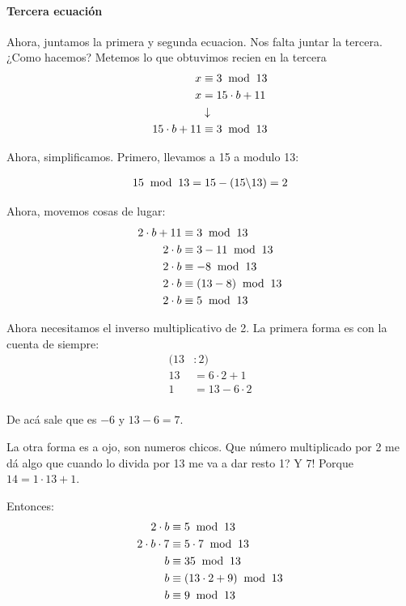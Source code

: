 \documentclass[12pt,a4paper]{report}
\begin{document}
\paragraph{Tercera ecuación}
Ahora, juntamos la primera y segunda ecuacion. Nos falta juntar la tercera. ¿Como hacemos? Metemos lo que obtuvimos recien en la tercera
$$
\begin{aligned}
x &\equiv 3 \; \bmod \; {{13}} \\
x &= 15 \cdot b + 11 \\
  &\downarrow \\
15 \cdot b + 11  &\equiv  3 \; \bmod \; {{13}} \\
\end{aligned}
$$

Ahora, simplificamos. Primero, llevamos a 15 a modulo 13:

$$
\begin{aligned}
  15 \; \bmod \; {{13}} = 15 - (15 \backslash 13) = 2
\end{aligned}
$$

Ahora, movemos cosas de lugar:
$$
\begin{aligned}
2 \cdot b + 11  &\equiv  3 \; \bmod \; {{13}} \\
2 \cdot b  &\equiv  3 - 11  \; \bmod \; {{13}} \\
2 \cdot b  &\equiv  -8  \; \bmod \; {{13}} \\
2 \cdot b  &\equiv  (13 - 8 )  \; \bmod \; {{13}} \\
2 \cdot b  &\equiv  5  \; \bmod \; {{13}} \\
\end{aligned}
$$

Ahora necesitamos el inverso multiplicativo de 2. La primera forma es con la cuenta de siempre:
$$
\begin{aligned}
  (13&:2)\\
  13 &= 6 \cdot 2 + 1 \\
  1 &= 13 - 6 \cdot 2 \\
\end{aligned}
$$

De acá sale que es $-6$ y $13 - 6 = 7$.

La otra forma es a ojo, son numeros chicos. Que número multiplicado por 2 me dá algo que cuando lo divida por 13 me va a dar resto 1? Y 7! Porque $14 = 1 \cdot 13 + 1$.

Entonces:
$$
\begin{aligned}
2 \cdot b  &\equiv  5  \; \bmod \; {{13}} \\
2 \cdot b \cdot 7 &\equiv  5 \cdot 7 \; \bmod \; {{13}} \\
b &\equiv  35 \; \bmod \; {{13}} \\
b &\equiv  (13 \cdot 2 + 9) \; \bmod \; {{13}} \\
b &\equiv  9 \; \bmod \; {{13}} \\
\end{aligned}
$$
\end{document}
